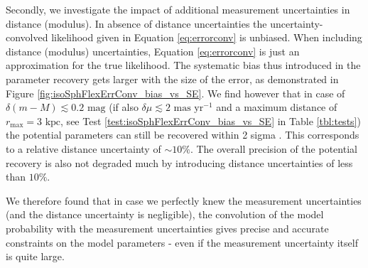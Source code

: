 Secondly, we investigate the impact of additional measurement uncertainties in distance (modulus). In absence of distance uncertainties the uncertainty-convolved likelihood given in Equation \ref{eq:errorconv} is unbiased.  When including distance (modulus) uncertainties, Equation \ref{eq:errorconv} is just an approximation for the true likelihood. The systematic bias thus introduced in the parameter recovery gets larger with the size of the error, as demonstrated in Figure \ref{fig:isoSphFlexErrConv_bias_vs_SE}.  We find however that in case of $\delta(m-M) \lesssim 0.2 \text{ mag}$ (if also $\delta \mu \lesssim 2 \text{ mas yr}^{-1}$ and a maximum distance of $r_\text{max} = 3 \text{ kpc}$, see Test \ref{test:isoSphFlexErrConv_bias_vs_SE} in Table \ref{tbl:tests}) the potential parameters can still be recovered within 2 sigma . This corresponds to a relative distance uncertainty of $\sim10\%$. The overall precision of the potential recovery is also not degraded much by introducing distance uncertainties of less than $10\%$.

We therefore found that in case we perfectly knew the measurement uncertainties (and the distance uncertainty is negligible), the convolution of the model probability with the measurement uncertainties gives precise and accurate constraints on the model parameters - even if the measurement uncertainty itself is quite large.






